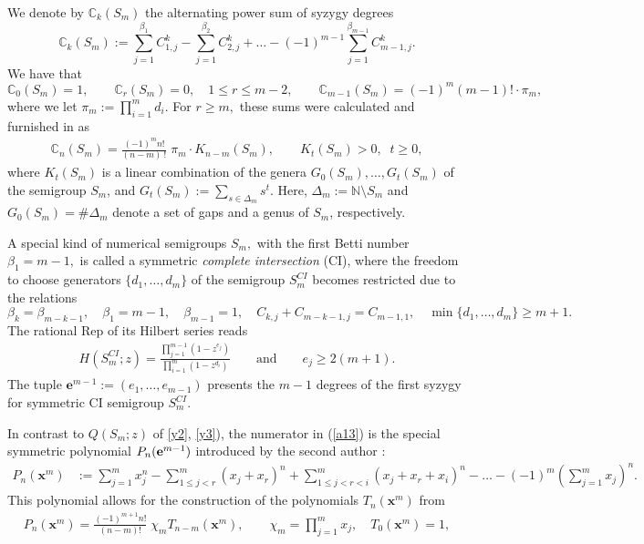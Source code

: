\documentclass[11pt]{amsart}
\theoremstyle{definition}
\theoremstyle{remark}
\numberwithin{equation}{section}
\def\bea{\begin{eqnarray}}
\def\eea{\end{eqnarray}}
\begin{document}
\smallskip
We denote by ${\mathbb C}_k(S_m)$ the alternating power sum of syzygy degrees
\begin{equation}
{\mathbb C}_k(S_m):=\sum_{j=1}^{\beta_1}C_{1,j}^k-\sum_{j=1}^{\beta_2}C_{2,j}^k+\ldots-(-1)^{m-1}\sum_{j=1}^{\beta_{m-1}}C_{m-1,j}^k.  %
\end{equation}
We have that \cite[Thm. 1]{fl17}
$$ {\mathbb C}_0(S_m)=1, \qquad
{\mathbb C}_r(S_m)=0,\quad 1\le r\le m-2,\qquad
{\mathbb C}_{m-1}(S_m)=(-1)^m(m-1)!\cdot \pi_m,
$$
where we let $\pi_m:=\prod_{i=1}^md_i$.
For $r\ge m,$ these sums 
 were calculated and furnished in \cite[(22)]{fl22}  as
\bea
{\mathbb C}_n(S_m)=\frac{(-1)^mn!}{(n-m)\:!}\;  \pi_m \cdot K_{n-m}(S_m),\qquad 
K_t(S_m)>0,\;\;t\ge 0,     \label{a5}
\eea
where $K_t(S_m)$ is a linear combination of the genera $G_0(S_m),\ldots,G_t(S_m)$ of the semigroup $S_m$, and $G_t(S_m):=\sum_{s\in\Delta_m}\!s^t$. 
Here,
$\Delta_m:={\mathbb N}\!\setminus S_m$ and $G_0(S_m)=\#\Delta_m$ denote a set
of gaps and a genus of $S_m$, respectively. 

A special kind of numerical semigroups $S_m,$ with the first Betti number $\beta_1=m-1,$ is called a symmetric {\em complete intersection} (CI), where the freedom to choose generators 
$\{d_1,\ldots,d_m\}$ of the semigroup $S_m^{CI}$ becomes restricted due to the relations
$$
\beta_k=\beta_{m-k-1},\quad\beta_1=m-1,\quad\beta_{m-1}=1,\quad C_{k,j}+C_{m-k-1,j}=C_{m-1,1},\quad 
\min\{d_1,\dots,d_m\}\geq m+1.
$$
The rational Rep of its Hilbert series reads
\bea
H\left(S_m^{CI};z\right)=\frac{\prod_{j=1}^{m-1}
\left(1-z^{e_j}\right)}
{\prod_{i=1}^m\left(1-z^{d_i}\right)}
\qquad \text{and} \qquad e_j\ge 2(m+1).     
\label{a13}
\eea
The tuple $\pmb{e}^{m-1}:=(e_1,\ldots,e_{m-1})$ presents the $m-1$ degrees of the first syzygy for symmetric CI semigroup $S_m^{CI}$. 

\smallskip
In contrast to $Q\left(S_m;z\right)$ of \eqref{y2}, \eqref{y3}), the numerator in (\ref{a13}) 
is the special symmetric polynomial $P_n({\bf e}^{m-1})$ 
introduced by the second author \cite{Fel}: 
\begin{align} \label{a9}
P_n(\pmb{x}^m)&:=\sum_{j=1}^mx_j^n-\sum_{1\le j<r}^m\left(x_j+x_r\right)^n+\sum_{1\le j<r<i}^m\left(x_j+x_r+x_i\right)^n-\ldots  -(-1)^m\left(\sum_{j=1}^mx_j\right)^n.
\end{align}
This polynomial allows \cite{Fel} for the construction of the polynomials $T_n(\pmb{x}^m)$ from
\bea
P_n(\pmb{x}^m)=\frac{(-1)^{m+1}n!}{(n-m)!}\;\chi_mT_{n-m}\left(\pmb{x}^m\right),\qquad \chi_m=\prod_{j=1}^mx_j,\quad 
T_0\left(\pmb{x}^m\right)=1,\label{a10}
\eea
\end{document}
